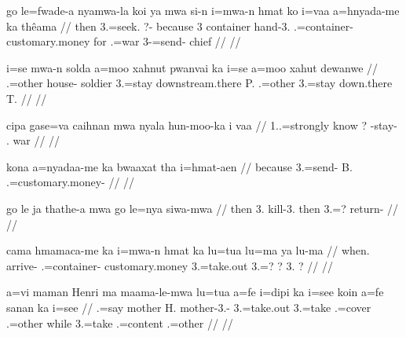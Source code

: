 \a
\begingl
\gla go le=fwade-a nyamwa-la koi ya mwa si-n i=mwa-n hmat ko i=vaa a=hnyada-me ka thêama
// \glb then 3.=seek. ?- because 3 container hand-3. .=container- customary.money for .=war 3-=send-  chief
// \glft  {}
// \endgl

\a
\begingl
\gla 
i=se mwa-n solda a=moo xahnut pwanvai ka i=se a=moo xahut dewanwe
// \glb {}.=other house- soldier 3.=stay downstream.there P.  .=other 3.=stay down.there T.
// \glft {}
// \endgl

\a
\begingl
\gla 
cipa gase=va caihnan mwa nyala hun-moo-ka i vaa
// \glb {} 1..=strongly know  ? -stay- . war
// \glft {}
// \endgl

\a
\begingl
\gla kona a=nyadaa-me ka bwaaxat tha i=hmat-aen 
// \glb because 3.=send-  B.  .=customary.money-
// \glft {}
// \endgl

\a\label{ex:thathe2}
\begingl
\gla go le ja thathe-a mwa go le=nya siwa-mwa
// \glb then 3.  kill-3.  then 3.=? return-
// \glft {}
// \endgl

\a
\begingl
\gla 
cama hmamaca-me ka i=mwa-n hmat ka lu=tua lu=ma ya lu-ma
// \glb when. arrive-  .=container- customary.money  3.=take.out 3.=? ? 3. ?
// \glft {}%
// \endgl

\a
\begingl
\gla a=vi maman Henri ma maama-le-mwa lu=tua a=fe i=dipi ka i=see koin a=fe sanan ka i=see 
// .=say mother H.  mother-3.- 3.=take.out 3.=take .=cover  .=other while 3.=take .=content  .=other
// \glft  {}
// \endgl

